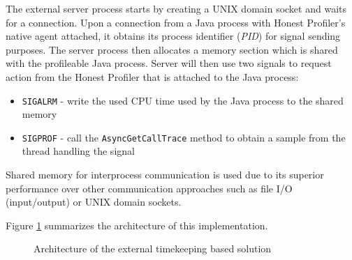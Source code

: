 \documentclass[..thesis.tex]{subfiles}
\begin{document}
The external server process starts by creating a UNIX domain socket and waits for a connection. Upon a connection from a Java process with Honest Profiler's native agent attached, it obtains its process identifier (\textit{PID}) for signal sending purposes. The server process then allocates a memory section which is shared with the profileable Java process. Server will then use two signals to request action from the Honest Profiler that is attached to the Java process:

\begin{itemize}
	\item \texttt{SIGALRM} - write the used CPU time used by the Java process to the shared memory
	\item \texttt{SIGPROF} - call the \texttt{Async\-Get\-Call\-Trace} method to obtain a sample from the thread handling the signal
\end{itemize}

Shared memory for interprocess communication is used due to its superior performance over other communication approaches such as file I/O (input/output) or UNIX domain sockets. 

Figure \ref{fig:shared_mem_arctitecture} summarizes the architecture of this implementation.
\begin{figure}[h]
\centering
{}
\caption{Architecture of the external timekeeping based solution}
\label{fig:shared_mem_arctitecture}
\end{figure}
\end{document}
